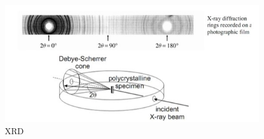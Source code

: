 \begin{figure}
  \includegraphics[width=0.75\linewidth]{Images/XRD.jpg}
  \caption{XRD}
  \label{fig:XRD}
\end{figure}
